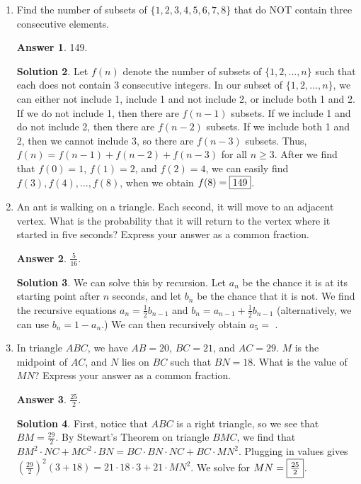 \documentclass[11pt]{article}
\theoremstyle{definition}
\newtheorem*{solution}{Solution}
\newtheorem*{answer}{Answer}
\begin{document}
\begin{enumerate}
\begin{solution}
\end{solution}

\item %
Find the number of subsets of $\{1, 2, 3, 4, 5, 6, 7, 8\}$ that do NOT contain three consecutive elements.

\begin{answer}
149.
\end{answer}
\begin{solution}
 Let $f(n)$ denote the number of subsets of $\{1, 2, \ldots, n\}$ such that each does not contain 3 consecutive integers. In our subset of $\{1, 2, \ldots , n\}$, we can either not include 1, include 1 and not include 2, or include both 1 and 2. If we do not include 1, then there are $f(n-1)$ subsets. If we include 1 and do not include 2, then there are $f(n-2)$ subsets. If we include both 1 and 2, then we cannot include 3, so there are $f(n-3)$ subsets. Thus, $f(n) = f(n-1) + f(n-2) + f(n-3)$ for all $n \geq 3$. After we find that $f(0) = 1$, $f(1) = 2$, and $f(2) = 4$, we can easily find $f(3), f(4), \ldots, f(8)$, when we obtain $f(8) = \framebox{149}$.
\end{solution}

\item %
An ant is walking on a triangle. Each second, it will move to an adjacent vertex. What is the probability that it will return to the vertex where it started in five seconds? Express your answer as a common fraction.

\begin{answer}
$\frac{5}{16}$.
\end{answer}
\begin{solution}
 We can solve this by recursion. Let $a_{n}$ be the chance it is at its starting point after $n$ seconds, and let $b_{n}$ be the chance that it is not. We find the recursive equations $a_{n} = \frac{1}{2}b_{n-1}$ and $b_{n} = a_{n-1} + \frac{1}{2}b_{n-1}$ (alternatively, we can use $b_{n} = 1 - a_{n}$.) We can then recursively obtain $a_{5} = $ .
\end{solution}

\item %
In triangle $ABC$, we have $AB = 20$, $BC = 21$, and $AC = 29$. $M$ is the midpoint of $AC$, and $N$ lies on $BC$ such that $BN = 18$. What is the value of $MN$? Express your answer as a common fraction.

\begin{answer}
$\frac{25}{2}$.
\end{answer}
\begin{solution}
 First, notice that $ABC$ is a right triangle, so we see that $BM = \frac{29}{2}$. By Stewart's Theorem on triangle $BMC$, we find that $BM^2 \cdot NC + MC^2 \cdot BN = BC \cdot BN \cdot NC + BC \cdot MN^2$. Plugging in values gives $(\frac{29}{2})^2(3 + 18) = 21 \cdot 18 \cdot 3 + 21 \cdot MN^2$. We solve for $MN = \framebox{$\frac{25}{2}$}$.
\end{solution}


\end{enumerate}
\end{document}
